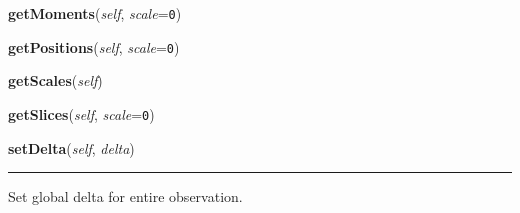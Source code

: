    \begin{boxedminipage}{\textwidth}

    \raggedright \textbf{getMoments}(\textit{self}, \textit{scale}=\texttt{0\-})

    \end{boxedminipage}

    \label{multireg:chipwavelets:Observation:getPositions}
    \vspace{0.5ex}

    \begin{boxedminipage}{\textwidth}

    \raggedright \textbf{getPositions}(\textit{self}, \textit{scale}=\texttt{0\-})

    \end{boxedminipage}

    \label{multireg:chipwavelets:Observation:getScales}
    \vspace{0.5ex}

    \begin{boxedminipage}{\textwidth}

    \raggedright \textbf{getScales}(\textit{self})

    \end{boxedminipage}

    \label{multireg:chipwavelets:Observation:getSlices}
    \vspace{0.5ex}

    \begin{boxedminipage}{\textwidth}

    \raggedright \textbf{getSlices}(\textit{self}, \textit{scale}=\texttt{0\-})

    \end{boxedminipage}

    \label{multireg:chipwavelets:Observation:setDelta}
    \vspace{0.5ex}

    \begin{boxedminipage}{\textwidth}

    \raggedright \textbf{setDelta}(\textit{self}, \textit{delta})

    \vspace{-1.5ex}

    \rule{\textwidth}{0.5\fboxrule}
    Set global delta for entire observation.

    \vspace{1ex}

    \end{boxedminipage}

